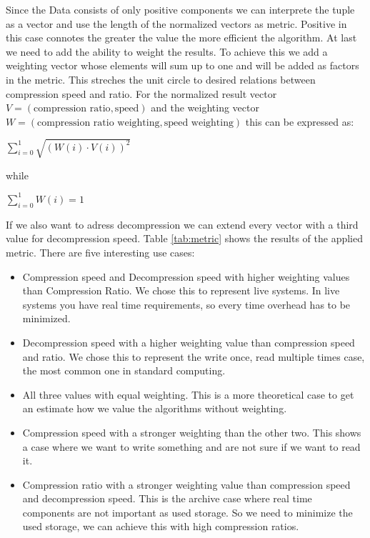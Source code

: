 \documentclass[
	12pt,
	a4paper,
	BCOR10mm,
	DIV14,
	listof=totoc,
	bibliography=totoc,
	headsepline
]{scrreprt}
\begin{document}
Since the Data consists of only positive components we can interprete the tuple as a vector and use the length of the normalized vectors as metric. 
Positive in this case connotes the greater the value the more efficient the algorithm.
At last we need to add the ability to weight the results. 
To achieve this we add a weighting vector whose elements will sum up to one and will be added as factors in the metric. 
This streches the unit circle to desired relations between compression speed and ratio.
For the normalized result vector \(V = (\text{compression ratio}, \text{speed})\) and the weighting vector \(W = (\text{compression ratio weighting}, \text{speed weighting})\) this can be expressed as:
\begin{center}
	\(
	\sum\limits^{1}_{i=0} \sqrt{(W(i) \cdot V(i))^2}
	\)
\end{center}
while
\begin{center}
	\(
	\sum\limits^{1}_{i=0}W(i) = 1
	\)
\end{center}
If we also want to adress decompression we can extend every vector with a third value for decompression speed.
Table \ref{tab:metric} shows the results of the applied metric.
There are five interesting use cases:
\begin{itemize}
	\item Compression speed and Decompression speed with higher weighting values than Compression Ratio.
	We chose this to represent live systems.  
	In live systems you have real time requirements, so every time overhead has to be minimized. 
	\\
	\item Decompression speed with a higher weighting value than compression speed and ratio.
	We chose this to represent the write once, read multiple times case, the most common one in standard computing.
	\item All three values with equal weighting.
	This is a more theoretical case to get an estimate how we value the algorithms without weighting.
	\\
	\item Compression speed with a stronger weighting than the other two.
	This shows a case where we want to write something and are not sure if we want to read it.
	\\
	\item Compression ratio with a stronger weighting value than compression speed and decompression speed.
	This is the archive case where real time components are not important as used storage.
	So we need to minimize the used storage, we can achieve this with high compression ratios.
\end{itemize}

\FloatBarrier
	
\end{document}
